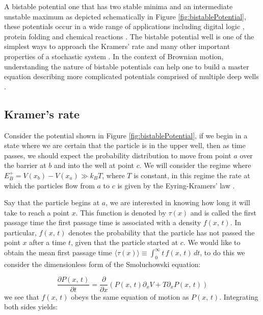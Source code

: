 A bistable potential one that has two stable minima and an intermediate unstable maximum as depicted schematically in Figure \ref{fig:bistablePotential}, these potentials occur in a wide range of applications including digital logic \cite{MyersCelebranoKrishnan2015,Landauer1961}, protein folding \cite{BryngelsonWolynes1989} and chemical reactions \cite{BernePecora1976}. The bistable potential well is one of the simplest ways to approach the Kramers' rate and many other important properties of a stochastic system \cite{MyersCelebranoKrishnan2015,Barcilon1996,SantamariaHolekGadomskiRubi2011}. In the context of Brownian motion, understanding the nature of bistable potentials can help one to build a master equation describing more complicated potentials comprised of multiple deep wells \cite{Barcilon1996, ChallisJack2014}.

\subsection{Kramer's rate}
Consider the potential shown in Figure \ref{fig:bistablePotential}, if we begin in a state where we are certain that the particle is in the upper well, then as time passes, we should expect the probability distribution to move from point $a$ over the barrier at $b$ and into the well at point $c$. We will consider the regime where $E^+_B = V(x_b) - V(x_a) \gg k_B T$, where $T$ is constant, in this regime the rate at which the particles flow from $a$ to $c$ is given by the Eyring-Kramers' law \cite{Eyring1935, Kramers1940}.

Say that the particle begins at $a$, we are interested in knowing how long it will take to reach a point $x$. This function is denoted by $\tau(x)$ and is called the first passage time \cite{Gardiner2009} the first passage time is associated with a density $f(x, \, t)$. In particular, $f(x, \, t)$ denotes the probability that the particle has not passed the point $x$ after a time $t$, given that the particle started at $c$. We would like to obtain the mean first passage time $\langle \tau(x) \rangle \equiv \int_0^{\infty} t \, f(x, \, t) \, dt$, to do this we consider the dimensionless form of the Smoluchowski equation: 

\begin{equation}
\frac{\partial P(x, \, t)}{\partial t} = \frac{\partial}{\partial x} \left(P(x, \, t) \partial_x V + T \partial_x P(x, \, t) \right)
\end{equation}
we see that $f(x, \, t)$ obeys the same equation of motion as $P(x, \, t)$. Integrating both sides yields:

